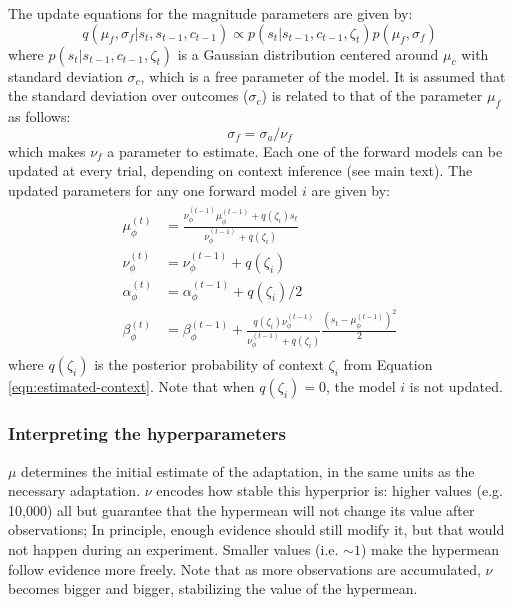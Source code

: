 \documentclass[a4paper,doc,floatsintext,natbib]{apa6}
\def \eref #1{Equation \ref{#1}}   %
\begin{document}
The update equations for the magnitude parameters are given by:
\begin{equation}
q(\mu_f, \sigma_f | s_t, s_{t-1}, c_{t-1}) \propto p(s_t |
s_{t-1}, c_{t-1}, \zeta_t)p(\mu_f, \sigma_f) \label{eqn:context-from-x}
\end{equation}
where $p(s_t | s_{t-1}, c_{t-1}, \zeta_t)$ is a Gaussian distribution centered
around $\mu_c$ with standard deviation $\sigma_c$, which is a free parameter of
the model. It is assumed that the standard deviation over outcomes ($\sigma_c$)
is related to that of the parameter $\mu_f$ as follows:
\begin{equation}
\sigma_f = \sigma_a / \nu_f
\end{equation}
which makes $\nu_f$ a parameter to estimate. Each one of the forward models can
be updated at every trial, depending on context inference (see main text). The
updated parameters for any one forward model $i$ are given by:
\begin{align}
  \begin{split}
  \mu_\phi^{(t)} &= \frac{\nu_\phi^{(t-1)} \mu_\phi^{(t-1)} + q(\zeta_i)s_t}{\nu_\phi^{(t-1)} + q(\zeta_i)} \\
  \nu_\phi^{(t)} &= \nu_\phi^{(t-1)} + q(\zeta_i) \\
  \alpha_\phi^{(t)} &= \alpha_\phi^{(t-1)} + q(\zeta_i) / 2 \\
  \beta_\phi^{(t)} &= \beta_\phi^{(t-1)} + \frac{q(\zeta_i)\nu_\phi^{(t-1)}}{\nu_\phi^{(t-1)} +
    q(\zeta_i)}\frac{\left(s_t - \mu_\phi^{(t-1)}\right)^2}{2}  \label{eqn:update-full}
  \end{split}
\end{align}
where $q(\zeta_i)$ is the posterior probability of context $\zeta_i$ from
\eref{eqn:estimated-context}. Note that when $q(\zeta_i) = 0$, the model $i$ is not
updated.

\subsubsection{Interpreting the hyperparameters}
\label{sec:interpreting-hyperparameters}
$\mu$ determines the initial estimate of the adaptation, in the same units as
the necessary adaptation. $\nu$ encodes how stable this hyperprior is: higher
values (e.g. 10,000) all but guarantee that the hypermean will not change its
value after observations; In principle, enough evidence should still modify it,
but that would not happen during an experiment. Smaller values (i.e. $\sim 1$)
make the hypermean follow evidence more freely. Note that as more observations
are accumulated, $\nu$ becomes bigger and bigger, stabilizing the value of the
hypermean.
\end{document}
